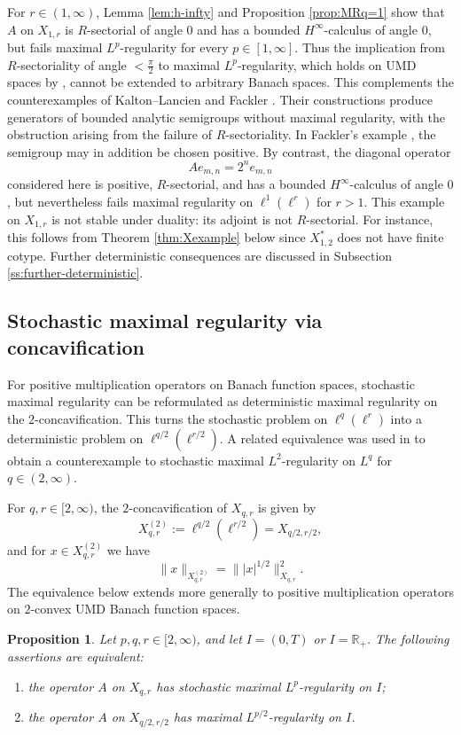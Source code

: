 \documentclass{amsart}
\theoremstyle{plain}
\theoremstyle{remark}
\theoremstyle{plain}
\newtheorem{proposition}[theorem]{Proposition}
\numberwithin{equation}{section}
\newcommand{\R}{\mathbb R}
\newcommand{\1}{\mathbf 1}
\begin{document}
For $r\in(1,\infty)$, Lemma \ref{lem:h-infty} and Proposition \ref{prop:MRq=1} show that $A$ on $X_{1,r}$ is $R$-sectorial of angle $0$ and has a bounded $H^\infty$-calculus of angle $0$, but fails maximal $L^p$-regularity for every $p\in[1,\infty]$. Thus the implication from $R$-sectoriality of angle $<\frac{\pi}{2}$ to maximal $L^p$-regularity, which holds on UMD spaces by \cite{Weis-MathAnn}, cannot be extended to arbitrary Banach spaces.
This complements the counterexamples of Kalton--Lancien \cite{KaLa02, KaLa} and Fackler \cite{Fack14,Fackl16}. Their constructions produce generators of bounded analytic semigroups without maximal regularity, with the obstruction arising from the failure of $R$-sectoriality. In Fackler's example \cite{Fackl16}, the semigroup may in addition be chosen positive. By contrast, the diagonal operator
\[
        Ae_{m,n}=2^ne_{m,n}
\]
considered here is positive, $R$-sectorial, and has a bounded
$H^\infty$-calculus of angle $0$, but nevertheless fails maximal
regularity on $\ell^1(\ell^r)$ for $r>1$. This example on $X_{1,r}$ is not stable under duality: its adjoint is not $R$-sectorial. For instance, this follows from Theorem \ref{thm:Xexample} below since $X_{1,2}^*$ does not have finite cotype.  Further deterministic consequences
are discussed in Subsection \ref{ss:further-deterministic}.

\subsection{Stochastic maximal regularity via concavification}
\label{ss:diagonal-stochastic}
For positive multiplication operators on Banach function spaces, stochastic maximal regularity can be reformulated as deterministic maximal regularity on the $2$-concavification. This turns the stochastic problem on $\ell^q(\ell^r)$ into a deterministic problem on $\ell^{q/2}(\ell^{r/2})$. A related equivalence was used in \cite{NVW-SMR} to obtain a counterexample to stochastic maximal $L^2$-regularity on $L^q$ for $q\in(2,\infty)$.

For $q,r\in[2,\infty)$, the $2$-concavification of $X_{q,r}$ is given by
\[
        X_{q,r}^{(2)}:=\ell^{q/2}(\ell^{r/2})
        =X_{q/2,r/2},
\]
and for $x\in X_{q,r}^{(2)}$ we have
\[
        \|x\|_{X_{q,r}^{(2)}}=\big\||x|^{1/2}\big\|_{X_{q,r}}^2.
\]
The equivalence below extends more generally to positive multiplication
operators on $2$-convex UMD Banach function spaces.

\begin{proposition}\label{prop:MRSMR}
Let $p,q,r\in[2,\infty)$, and let $I= (0,T)$ or $I = \R_+$. The following assertions are equivalent:
\begin{enumerate}[label={\rm(\arabic*)}, leftmargin=*]
\item\label{it:MRSMR1}
the operator $A$ on $X_{q,r}$ has stochastic maximal
$L^p$-regularity on $I$;
\item\label{it:MRSMR2}
the operator $A$ on $X_{q/2,r/2}$ has maximal
$L^{p/2}$-regularity on $I$.
\end{enumerate}
\end{proposition}
\end{document}
